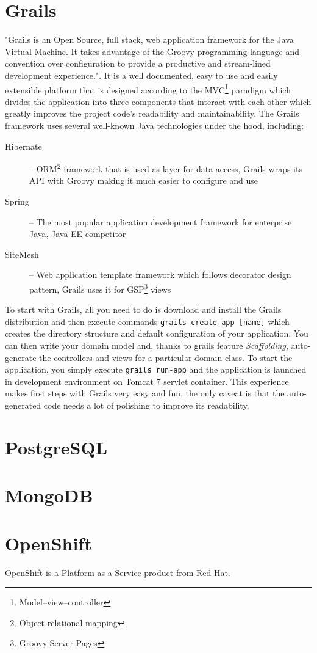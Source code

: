 \section{Grails}

"Grails is an Open Source, full stack, web application framework for the Java Virtual Machine. It takes advantage of the Groovy programming language and convention over configuration to provide a productive and stream-lined development experience."\cite{grails-homepage}. It is a well documented, easy to use and easily extensible platform that is designed according to the MVC\footnote{Model--view--controller} paradigm which divides the application into three components that interact with each other which greatly improves the project code's readability and maintainability. The Grails framework uses several well-known Java technologies under the hood, including:

\begin{description}
    \item[Hibernate] -- ORM\footnote{Object-relational mapping} framework that is used as layer for data access, Grails wraps its API with Groovy making it much easier to configure and use
    \item[Spring] -- The most popular application development framework for enterprise Java\cite{springsource-homepage}, Java EE competitor
    \item[SiteMesh] -- Web application template framework which follows decorator design pattern, Grails uses it for GSP\footnote{Groovy Server Pages} views
\end{description}

To start with Grails, all you need to do is download and install the Grails distribution and then execute commands \texttt{grails create-app [name]} which creates the directory structure and default configuration of your application. You can then write your domain model and, thanks to grails feature \emph{Scaffolding}, auto-generate the controllers and views for a particular domain class. To start the application, you simply execute \texttt{grails run-app} and the application is launched in development environment on Tomcat 7 servlet container. This experience makes first steps with Grails very easy and fun, the only caveat is that the auto-generated code needs a lot of polishing to improve its readability.

\section{PostgreSQL}

\faketext[5]

\section{MongoDB}

\faketext[5]

\section{OpenShift}

OpenShift is a Platform as a Service product from Red Hat.

\faketext[10]

